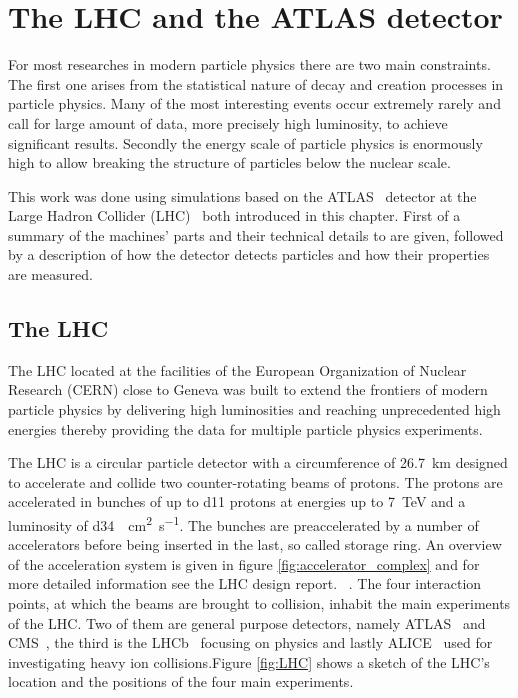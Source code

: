 \chapter{The LHC and the ATLAS detector}
\label{lhc_atlas}


For most researches in modern particle physics there are two main constraints. The first one arises from the statistical nature of decay and creation processes in particle physics. Many of the most interesting events occur extremely rarely and call for large amount of data, more precisely high luminosity, to achieve significant results. Secondly the energy scale of particle physics is enormously high to allow breaking the structure of particles below the nuclear scale.

This work was done using simulations based on the ATLAS~\cite{atlas} detector at the Large Hadron Collider (LHC)~\cite{lhc_machine} both introduced in this chapter. First of a summary of the machines' parts and their technical details to are given, followed by a description of how the detector detects particles and how their properties are measured.

\section{The LHC}

The LHC located at the facilities of the European Organization of Nuclear Research (CERN) close to Geneva was built to extend the frontiers of modern particle physics by delivering high luminosities and reaching unprecedented high energies thereby providing the data for multiple particle physics experiments.

The LHC is a circular particle detector with a circumference of \SI{26.7}{\kilo \metre} designed to  accelerate and collide two counter-rotating beams of protons. The protons are accelerated in bunches of up to \num{d11} protons at  energies up to \SI{7}{\tera \electronvolt} and a luminosity of \SI{d34}{\per\square\cm \per\s}. The bunches are preaccelerated by a number of accelerators before being inserted in the last, so called storage ring. An overview of the acceleration system is given in figure \ref{fig:accelerator_complex} and for more detailed information see the LHC design report. ~\cite{lhc_machine}. 
The four interaction points, at which the beams are brought to collision, inhabit the main experiments of the LHC. Two of them are general purpose detectors, namely ATLAS~\cite{atlas} and CMS~\cite{cms}, the third is the LHCb~\cite{lhcb} focusing on \Pbottom physics and lastly ALICE~\cite{alice} used for investigating heavy ion collisions.Figure \ref{fig:LHC} shows a sketch of the LHC's location and the positions of the four main experiments.

